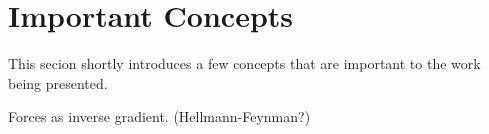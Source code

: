 \section{Important Concepts}
\label{sec:important-concepts}

This secion shortly introduces a few concepts that are important to the work being presented.

\bit
\item Forces as inverse gradient. (Hellmann-Feynman?)
\eit

\incomplete





